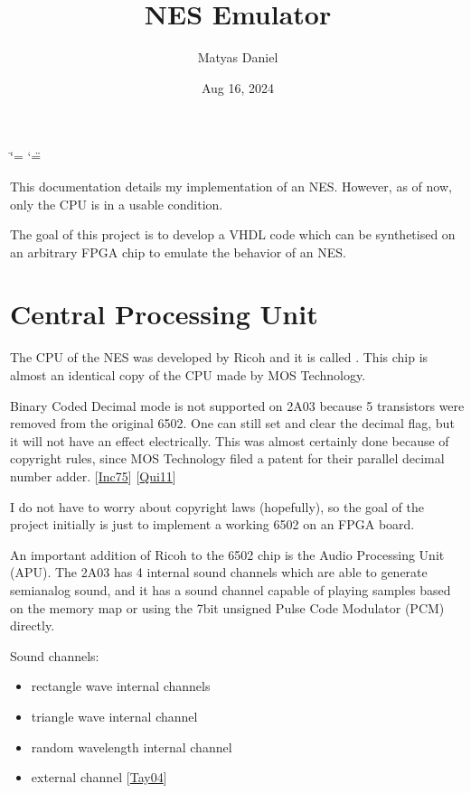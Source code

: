\documentclass[letterpaper,10pt,english]{sphinxmanual}
\title{NES Emulator}
\date{Aug 16, 2024}
\author{Matyas Daniel}
\begin{document}
\ifdefined\shorthandoff
  \ifnum\catcode`\=\string=\active\shorthandoff{=}\fi
  \ifnum\catcode`\"=\active{}\fi
\fi

\pagestyle{empty}
\sphinxmaketitle
\pagestyle{plain}
\sphinxtableofcontents
\pagestyle{normal}
\label{\detokenize{index::doc}}


\sphinxAtStartPar
This documentation details my implementation of an NES. However, as of now, only
the CPU is in a usable condition.

\sphinxAtStartPar
The goal of this project is to develop a VHDL code which can be synthetised on
an arbitrary FPGA chip to emulate the behavior of an NES.

\sphinxstepscope


\chapter{Central Processing Unit}
\label{\detokenize{cpu:central-processing-unit}}\label{\detokenize{cpu::doc}}
\sphinxAtStartPar
The CPU of the NES was developed by Ricoh and it is called . This chip
is almost an identical copy of the CPU  made by MOS Technology.

\sphinxAtStartPar
Binary Coded Decimal mode is not supported on 2A03 because 5 transistors were
removed from the original 6502. One can still set and clear the decimal flag,
but it will not have an effect electrically. This was almost certainly done
because of copyright rules, since MOS Technology filed a patent for their
parallel decimal number adder. {[}\hyperlink{cite.index:id10}{Inc75}{]} {[}\hyperlink{cite.index:id8}{Qui11}{]}

\sphinxAtStartPar
I do not have to worry about copyright laws (hopefully), so the goal of the
project initially is just to implement a working 6502 on an FPGA board.

\sphinxAtStartPar
An important addition of Ricoh to the 6502 chip is the Audio Processing Unit
(APU). The 2A03 has 4 internal sound channels which are able to generate
semi\sphinxhyphen{}analog sound, and it has a sound channel capable of playing samples based
on the memory map or using the 7\sphinxhyphen{}bit unsigned Pulse Code Modulator (PCM)
directly.

\sphinxAtStartPar
Sound channels:
\begin{itemize}
\item {} 
 rectangle wave internal channels

\item {} 
 triangle wave internal channel

\item {} 
 random wavelength internal channel

\item {} 
 external channel {[}\hyperlink{cite.index:id5}{Tay04}{]}

\end{itemize}
\end{document}
